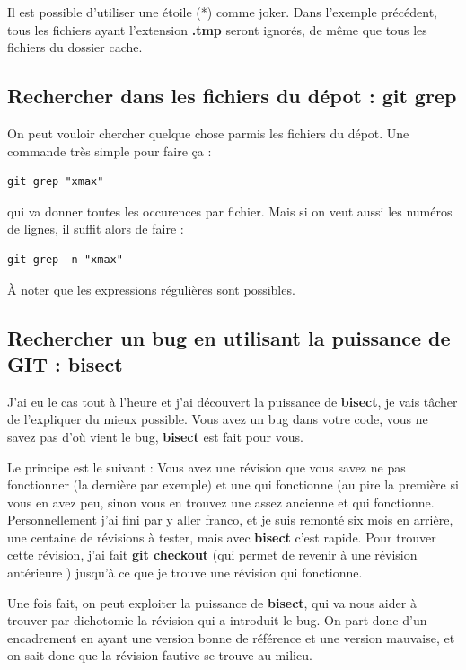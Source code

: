 \documentclass[a4paper,twoside]{article}
\begin{document}
Il est possible d'utiliser une étoile (*) comme joker. Dans l'exemple précédent, tous les fichiers ayant l'extension \textbf{.tmp} seront ignorés, de même que tous les fichiers du dossier cache.

\subsection{Rechercher dans les fichiers du dépot : git grep}
On peut vouloir chercher quelque chose parmis les fichiers du dépot. Une commande très simple pour faire ça : 
\begin{verbatim}
git grep "xmax"
\end{verbatim}
qui va donner toutes les occurences par fichier. Mais si on veut aussi les numéros de lignes, il suffit alors de faire :
\begin{verbatim}
git grep -n "xmax"
\end{verbatim}

\begin{remarque}
À noter que les expressions régulières sont possibles.
\end{remarque}

\subsection{Rechercher un bug en utilisant la puissance de GIT : bisect}
J'ai eu le cas tout à l'heure et j'ai découvert la puissance de \textbf{bisect}, je vais tâcher de l'expliquer du mieux possible. Vous avez un bug dans votre code, vous ne savez pas d'où vient le bug, \textbf{bisect} est fait pour vous. 

Le principe est le suivant : Vous avez une révision que vous savez ne pas fonctionner (la dernière par exemple) et une qui fonctionne (au pire la première si vous en avez peu, sinon vous en trouvez une assez ancienne et qui fonctionne. Personnellement j'ai fini par y aller franco, et je suis remonté six mois en arrière, une centaine de révisions à tester, mais avec \textbf{bisect} c'est rapide. Pour trouver cette révision, j'ai fait \textbf{git checkout} (qui permet de revenir à une révision antérieure ) jusqu'à ce que je trouve une révision qui fonctionne. 

Une fois fait, on peut exploiter la puissance de \textbf{bisect}, qui va nous aider à trouver par dichotomie la révision qui a introduit le bug. On part donc d'un encadrement en ayant une version bonne de référence et une version mauvaise, et on sait donc que la révision fautive se trouve au milieu.
\end{document}
